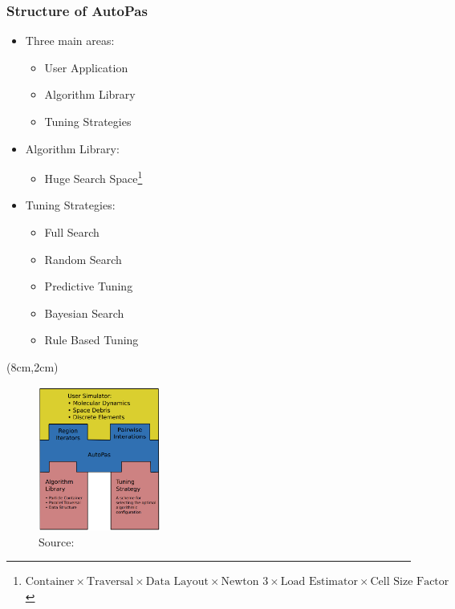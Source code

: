 \documentclass[
	10pt,
	t		%
]{beamer}
\begin{document}
\begin{frame}
	\frametitle{Structure of AutoPas}

	\begin{itemize}
		\item Three main areas:
		      \begin{itemize}
			      \item User Application
			      \item Algorithm Library
			      \item Tuning Strategies
		      \end{itemize}
		\item Algorithm Library:
		      \begin{itemize}
			      \item Huge Search Space\footnote{\scriptsize{$\text{Container}\times\text{Traversal} \times \text{Data Layout} \times \text{Newton 3} \times \text{Load Estimator} \times \text{Cell Size Factor}$}
			            }
		      \end{itemize}
		\item Tuning Strategies:
		      \begin{itemize}
			      \item Full Search
			      \item Random Search
			      \item Predictive Tuning
			      \item Bayesian Search
			      \item Rule Based Tuning
		      \end{itemize}
	\end{itemize}

	\begin{textblock*}{4cm}(8cm,2cm)
		\begin{figure}
			\includegraphics[width=4cm]{figures/AutoPasLibraryStructure.png}
			\caption{ \footnotesize{Source: \cite{Newcome2023Poster}}}

		\end{figure}
	\end{textblock*}
\end{frame}
\end{document}
